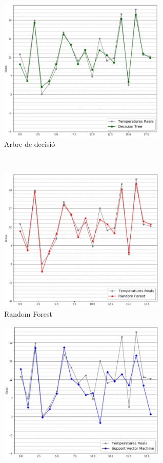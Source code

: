 \documentclass[10pt,a4paper,twocolumn,twoside]{article}
\begin{document}
\begin{figure}[htb!]
    \begin{subfigure}[htb!]{0.5\textwidth}
        	\includegraphics[width=80mm]{../img/decisionTreePredict}
	\caption{Arbre de decisió}
	\label{fig-DT}
    \end{subfigure}
    ~ %
    \begin{subfigure}[htb!]{0.5\textwidth}
	\includegraphics[width=80mm]{../img/randomForestPredict}
	\caption{Random Forest}
	\label{fig-RF}
    \end{subfigure}
	\hfill
 \begin{subfigure}[htb!]{0.5\textwidth}
	\includegraphics[width=80mm]{../img/SVMPredict}

\end{subfigure}
\end{figure}
\end{document}
